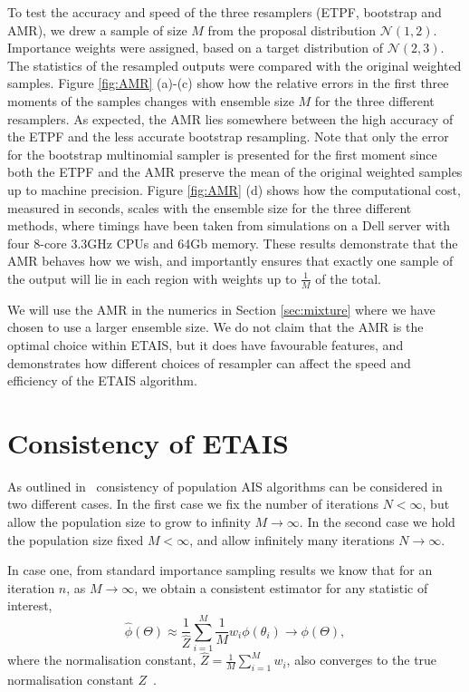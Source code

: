 \documentclass[final]{siamltex}
\begin{document}
To test the accuracy and speed of the three resamplers (ETPF,
bootstrap and AMR), we drew a sample of size $M$ from the proposal distribution
$\mathcal{N}(1,2)$. Importance weights were assigned, based on a
target distribution of $\mathcal{N}(2,3)$. The statistics of the
resampled outputs were compared with the original weighted samples. Figure \ref{fig:AMR} (a)-(c) show how the relative errors in the first
three moments of the samples changes with ensemble size $M$ for the three different
resamplers. As expected, the AMR lies somewhere between the high
accuracy of the ETPF and the less accurate bootstrap
resampling. Note that only the error for the bootstrap multinomial
sampler is presented for the first moment since both the ETPF and the
AMR preserve the mean of the original weighted samples up to machine precision. Figure \ref{fig:AMR} (d) shows how the computational cost,
measured in seconds, scales with the ensemble size for the three
different methods, where timings have been taken from simulations on a Dell
server with four 8-core 3.3GHz CPUs and 64Gb memory. These results demonstrate that the AMR behaves how we wish, and
importantly ensures that exactly one sample of the output will lie in
each region with weights up to $\frac{1}{M}$ of the total.

We will use the AMR in the numerics in Section \ref{sec:mixture}
where we have chosen to use a larger ensemble size. We do not claim
that the AMR is the optimal choice within ETAIS, but it does have
favourable features, and demonstrates how different choices of
resampler can affect the speed and efficiency of the ETAIS algorithm.


\section{Consistency of ETAIS}\label{sec:consistency}

As outlined in~\cite{martino2015adaptive} consistency of population AIS algorithms can be considered in two different cases. In the first case we fix the number of iterations $N < \infty$, but allow the population size to grow to infinity $M\rightarrow\infty$. In the second case we hold the population size fixed $M<\infty$, and allow infinitely many iterations $N\rightarrow\infty$.

In case one, from standard importance sampling results we know that for an iteration $n$, as $M\rightarrow\infty$, we obtain a consistent estimator for any statistic of interest,
\[
	\hat{\phi}(\Theta) \approx \frac{1}{\hat{Z}}\sum\limits_{i=1}^M \! \frac{1}{M}w_i\phi(\theta_i) \rightarrow \phi(\Theta),
\]
where the normalisation constant, $\hat{Z} = \frac{1}{M}\sum_{i=1}^M \! w_i$, also converges to the true normalisation constant $Z$~\cite{robert2013monte}.
\end{document}
